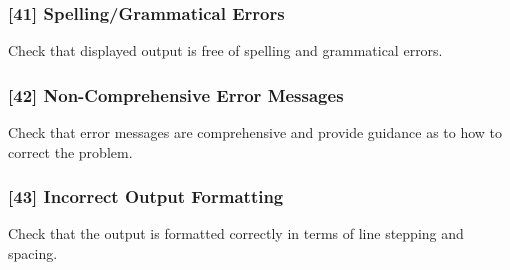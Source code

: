 \subsubsection{[41] Spelling/Grammatical Errors}
Check that displayed output is free of spelling and grammatical errors.
\subsubsection{[42] Non-Comprehensive Error Messages}
Check that error messages are comprehensive and provide guidance as to how to correct the problem.
\subsubsection{[43] Incorrect Output Formatting}
Check that the output is formatted correctly in terms of line stepping and spacing.